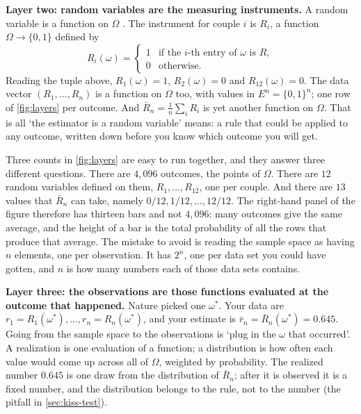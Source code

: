 \textbf{Layer two: random variables are the measuring instruments.}
A random variable is a function on $\Omega$ .
The instrument for couple $i$ is $R_i$, a function $\Omega \to \{0,1\}$ defined by
\[
R_i(\omega) = \begin{cases} 1 & \text{if the } i\text{-th entry of } \omega \text{ is } R, \\ 0 & \text{otherwise.}\end{cases}
\]
Reading the tuple above, $R_1(\omega) = 1$, $R_2(\omega) = 0$ and $R_{12}(\omega) = 0$.
The data vector $(R_1, \ldots, R_n)$ is a function on $\Omega$ too, with values in $E^n = \{0,1\}^n$; one row of \cref{fig:layers} per outcome.
And $\bar{R}_n = \frac{1}{n}\sum_i R_i$ is yet another function on $\Omega$.
That is all `the estimator is a random variable' means: a rule that could be applied to any outcome, written down before you know which outcome you will get.

\begin{pitfall}
Three counts in \cref{fig:layers} are easy to run together, and they answer three different questions.
There are $4{,}096$ outcomes, the points of $\Omega$.
There are $12$ random variables defined on them, $R_1, \ldots, R_{12}$, one per couple.
And there are $13$ values that $\bar{R}_n$ can take, namely $0/12, 1/12, \ldots, 12/12$.
The right-hand panel of the figure therefore has thirteen bars and not $4{,}096$: many outcomes give the same average, and the height of a bar is the total probability of all the rows that produce that average.
The mistake to avoid is reading the sample space as having $n$ elements, one per observation.
It has $2^n$, one per data set you could have gotten, and $n$ is how many numbers each of those data sets contains.
\end{pitfall}

\textbf{Layer three: the observations are those functions evaluated at the outcome that happened.}
Nature picked one $\omega^*$.
Your data are $r_1 = R_1(\omega^*), \ldots, r_n = R_n(\omega^*)$, and your estimate is $\bar{r}_n = \bar{R}_n(\omega^*) = 0.645$.
Going from the sample space to the observations is `plug in the $\omega$ that occurred'.
A realization is one evaluation of a function; a distribution is how often each value would come up across all of $\Omega$, weighted by probability.
The realized number $0.645$ is one draw from the distribution of $\bar{R}_n$; after it is observed it is a fixed number, and the distribution belongs to the rule, not to the number (the pitfall in \cref{sec:kiss-test}).

